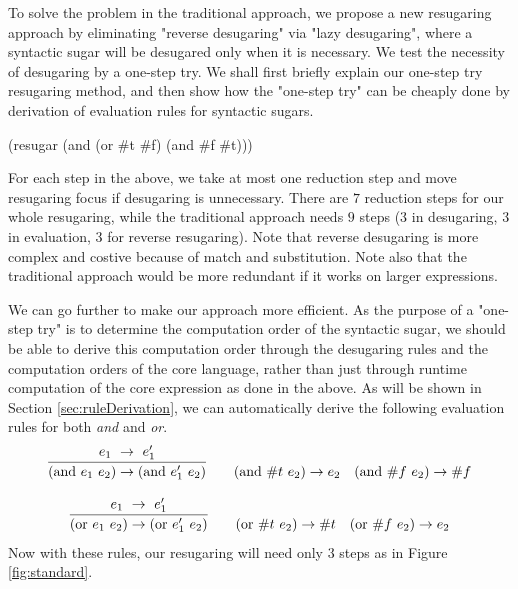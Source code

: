 To solve the problem in the traditional approach, we propose a new resugaring approach by eliminating "reverse desugaring" via "lazy desugaring", where a syntactic sugar will be desugared only when it is necessary. We test the necessity of desugaring by a one-step try. We shall first briefly explain our one-step try resugaring method, and then show how the "one-step try" can be cheaply done by derivation of evaluation rules for syntactic sugars.
\begin{Codes}
    (resugar (and (or \#t \#f) (and \#f \#t)))
 
 
\end{Codes}

For each step in the above, we take at most one reduction step and move resugaring focus if desugaring is unnecessary. There are $7$ reduction steps for our whole resugaring, while the traditional approach needs $9$ steps ($3$ in desugaring, $3$ in evaluation, $3$ for reverse resugaring). Note that reverse desugaring is more complex and costive because of match and substitution. Note also that the traditional approach would be more redundant if it works on larger expressions.

We can go further to make our approach more efficient. As the purpose of a "one-step try" is to determine the computation order of the syntactic sugar, we should be able to derive this computation order through the desugaring rules and the computation orders of the core language, rather than just through runtime computation of the core expression as done in the above. As will be shown in Section \ref{sec:ruleDerivation}, we can automatically derive the following evaluation rules for both \emph{and} and \emph{or}.
\[
\begin{array}{c}
\infer {(\mbox{and}~e_1~e_2) \rightarrow (\mbox{and}~e_1'~e_2)} {e_1~ \rightarrow~e_1'}
\qquad
(\mbox{and}~\#t~e_2) \rightarrow e_2
\quad
(\mbox{and}~\#f~e_2) \rightarrow \#f \\
\\
\infer {(\mbox{or}~e_1~e_2) \rightarrow (\mbox{or}~e_1'~e_2)} {e_1~ \rightarrow~e_1'}
\qquad
(\mbox{or}~\#t~e_2) \rightarrow \#t
\quad
(\mbox{or}~\#f~e_2) \rightarrow e_2 \\
\end{array}
\]
Now with these rules, our resugaring will need only $3$ steps as in Figure \ref{fig:standard}.

